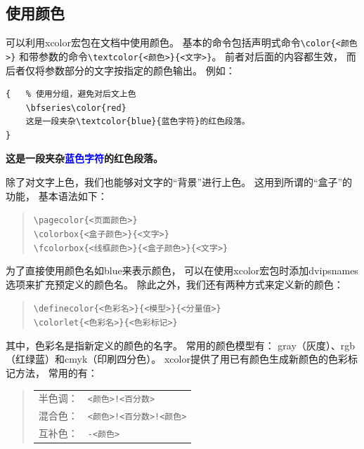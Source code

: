 \documentclass[UTF8]{ctexart}
\numberwithin{equation}{section}			%
\begin{document}
    \subsection{使用颜色}
    可以利用xcolor宏包在文档中使用颜色。
    基本的命令包括声明式命令\verb|\color{<颜色>}|
    和带参数的命令\verb|\textcolor{<颜色>}{<文字>}|。
    前者对后面的内容都生效，
    而后者仅将参数部分的文字按指定的颜色输出。
    例如：
    
\begin{lstlisting}
{	% 使用分组，避免对后文上色
    \bfseries\color{red}		
    这是一段夹杂\textcolor{blue}{蓝色字符}的红色段落。
}
\end{lstlisting}
    
    {	%
        \bfseries\color{red}		
        这是一段夹杂\textcolor{blue}{蓝色字符}的红色段落。
    }

    除了对文字上色，我们也能够对文字的“背景”进行上色。
    这用到所谓的“盒子”的功能，
    基本语法如下：
    
    \begin{quote}
        \verb|\pagecolor{<页面颜色>}| \\
        \verb|\colorbox{<盒子颜色>}{<文字>}| \\
        \verb|\fcolorbox{<线框颜色>}{<盒子颜色>}{<文字>}|
    \end{quote}
    
    为了直接使用颜色名如blue来表示颜色，
    可以在使用xcolor宏包时添加dvipsnames选项来扩充预定义的颜色名。
    除此之外，我们还有两种方式来定义新的颜色：
    
    \begin{quote}
        \verb|\definecolor{<色彩名>}{<模型>}{<分量值>}| \\
        \verb|\colorlet{<色彩名>}{<色彩标记>}|
    \end{quote}
    
    其中，色彩名是指新定义的颜色的名字。
    常用的颜色模型有：
    gray（灰度）、rgb（红绿蓝）和cmyk（印刷四分色）。
    xcolor提供了用已有颜色生成新颜色的色彩标记方法，
    常用的有：
    
    \begin{quote}
        \begin{tabular}{ll}
            半色调： & \verb|<颜色>!<百分数>| \\
            混合色： & \verb|<颜色>!<百分数>!<颜色>| \\
            互补色： & \verb|-<颜色>| \\
        \end{tabular}
    \end{quote}
    
\end{document}
